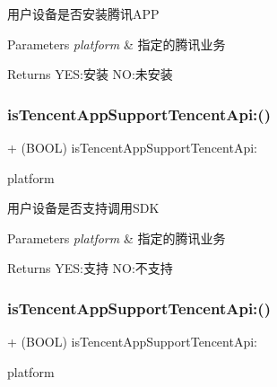 用户设备是否安装腾讯\+A\+PP 
\begin{DoxyParams}{Parameters}
{\em platform} & 指定的腾讯业务 \\
\hline
\end{DoxyParams}
\begin{DoxyReturn}{Returns}
Y\+ES\+:安装 NO\+:未安装 
\end{DoxyReturn}
\mbox{\label{interface_tencent_api_interface_a5286611f97530ca889a83d0b34bc74d1}} 
\subsubsection{\texorpdfstring{is\+Tencent\+App\+Support\+Tencent\+Api\+:()}{isTencentAppSupportTencentApi:()}\hspace{0.1cm}{\footnotesize\ttfamily [1/2]}}
{\footnotesize\ttfamily + (B\+O\+OL) is\+Tencent\+App\+Support\+Tencent\+Api\+: \begin{DoxyParamCaption}\item[{(Tecnent\+Platform\+Type)}]{platform }\end{DoxyParamCaption}}

用户设备是否支持调用\+S\+DK 
\begin{DoxyParams}{Parameters}
{\em platform} & 指定的腾讯业务 \\
\hline
\end{DoxyParams}
\begin{DoxyReturn}{Returns}
Y\+ES\+:支持 NO\+:不支持 
\end{DoxyReturn}
\mbox{\label{interface_tencent_api_interface_a5286611f97530ca889a83d0b34bc74d1}} 
\subsubsection{\texorpdfstring{is\+Tencent\+App\+Support\+Tencent\+Api\+:()}{isTencentAppSupportTencentApi:()}\hspace{0.1cm}{\footnotesize\ttfamily [2/2]}}
{\footnotesize\ttfamily + (B\+O\+OL) is\+Tencent\+App\+Support\+Tencent\+Api\+: \begin{DoxyParamCaption}\item[{(Tecnent\+Platform\+Type)}]{platform }\end{DoxyParamCaption}}

